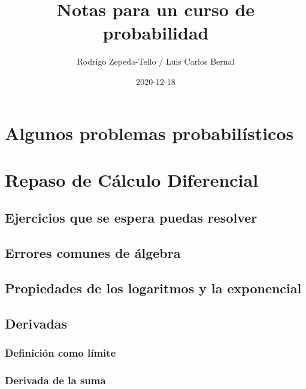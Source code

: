\documentclass[
]{book}
\title{Notas para un curso de probabilidad}
\author{Rodrigo Zepeda-Tello / Luis Carlos Bernal}
\date{2020-12-18}
\begin{document}
\maketitle

{
\setcounter{tocdepth}{1}
\tableofcontents
}
\hypertarget{algunos-problemas-probabiluxedsticos}{%
\chapter{Algunos problemas probabilísticos}\label{algunos-problemas-probabiluxedsticos}}

\hypertarget{repaso_diferencial}{%
\chapter{Repaso de Cálculo Diferencial}\label{repaso_diferencial}}

\hypertarget{ejercicios-que-se-espera-puedas-resolver}{%
\section{Ejercicios que se espera puedas resolver}\label{ejercicios-que-se-espera-puedas-resolver}}

\hypertarget{errores-comunes-de-uxe1lgebra}{%
\section{Errores comunes de álgebra}\label{errores-comunes-de-uxe1lgebra}}

\hypertarget{propiedades-de-los-logaritmos-y-la-exponencial}{%
\section{Propiedades de los logaritmos y la exponencial}\label{propiedades-de-los-logaritmos-y-la-exponencial}}

\hypertarget{derivadas}{%
\section{Derivadas}\label{derivadas}}

\hypertarget{definiciuxf3n-como-luxedmite}{%
\subsection{Definición como límite}\label{definiciuxf3n-como-luxedmite}}

\hypertarget{derivada-de-la-suma}{%
\subsection{Derivada de la suma}\label{derivada-de-la-suma}}
\end{document}
